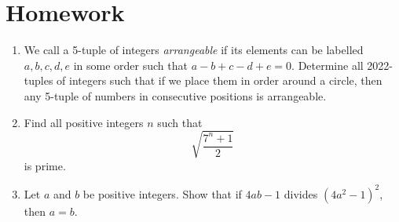 \documentclass{article}
\begin{document}
\section{Homework}
  \begin{enumerate}
    \item We call a 5-tuple of integers \emph{arrangeable} if its elements can be
      labelled $a,b,c,d,e$ in some order such that $a-b+c-d+e=0$. Determine all
      2022-tuples of integers such that if we place them in order around a
      circle, then any 5-tuple of numbers in consecutive positions is
      arrangeable.
    \item Find all positive integers $n$ such that \[\sqrt{\frac{7^n+1}2}\] is
      prime.
    \item Let $a$ and $b$ be positive integers. Show that if $4ab-1$ divides
      $(4a^2-1)^2$, then $a=b$.
  \end{enumerate}
\end{document}
